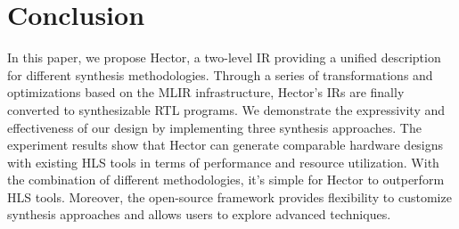 \section{Conclusion}

In this paper, we propose Hector, a two-level IR providing a unified description for different synthesis methodologies. Through a series of transformations and optimizations based on the MLIR infrastructure, Hector's IRs are finally converted to synthesizable RTL programs. We demonstrate the expressivity and effectiveness of our design by implementing three synthesis approaches. The experiment results show that Hector can generate comparable hardware designs with existing HLS tools in terms of performance and resource utilization. With the combination of different methodologies, it's simple for Hector to outperform HLS tools. Moreover, the open-source framework provides flexibility to customize synthesis approaches and allows users to explore advanced techniques.